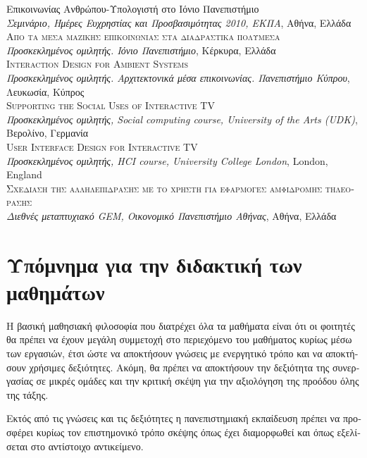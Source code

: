 \documentclass[11pt, a4paper]{article}
\newcommand{\note}[1]{\marginnote{\scriptsize #1}}
\begin{document}
\begin{greek}
{Επικοινωνίας Ανθρώπου-Υπολογιστή στο Ιόνιο Πανεπιστήμιο}\\
\emph{Σεμινάριο, Ημέρες Ευχρηστίας και Προσβασιμότητας 2010,
ΕΚΠΑ}, Αθήνα, Ελλάδα\\[.2cm]
\note{2007}\textsc{Από τα μέσα μαζικής επικοινωνίας στα διαδραστικά
πολυμέσα}\\
\emph{Προσκεκλημένος ομιλητής. Ιόνιο Πανεπιστήμιο}, Κέρκυρα,
Ελλάδα\\[.2cm]
\note{2006}\textsc{Interaction Design for Ambient Systems}\\
\emph{Προσκεκλημένος ομιλητής. Αρχιτεκτονικά μέσα επικοινωνίας.
Πανεπιστήμιο Κύπρου}, Λευκωσία, Κύπρος\\[.2cm]
\note{2006}\textsc{Supporting the Social Uses of Interactive TV}\\
\emph{Προσκεκλημένος ομιλητής, Social computing course, University of
the Arts (UDK)}, Βερολίνο, Γερμανία\\[.2cm]
\note{2005}\textsc{User Interface Design for Interactive TV}\\
\emph{Προσκεκλημένος ομιλητής, HCI course, University College
London}, London, England\\[.2cm]
\note{2002}\textsc{Σχεδίαση της αλληλεπίδρασης με το χρήστη για
εφαρμογές αμφίδρομης τηλεόρασης}\\
\emph{Διεθνές μεταπτυχιακό GEM, Οικονομικό Πανεπιστήμιο Αθήνας}, Αθήνα,
Ελλάδα\\[.2cm]

\section{Υπόμνημα για την διδακτική των
μαθημάτων}\label{ux3c5ux3c0ux3ccux3bcux3bdux3b7ux3bcux3b1-ux3b3ux3b9ux3b1-ux3c4ux3b7ux3bd-ux3b4ux3b9ux3b4ux3b1ux3baux3c4ux3b9ux3baux3ae-ux3c4ux3c9ux3bd-ux3bcux3b1ux3b8ux3b7ux3bcux3acux3c4ux3c9ux3bd}

Η βασική μαθησιακή φιλοσοφία που διατρέχει όλα τα μαθήματα είναι ότι οι
φοιτητές θα πρέπει να έχουν μεγάλη συμμετοχή στο περιεχόμενο του
μαθήματος κυρίως μέσω των εργασιών, έτσι ώστε να αποκτήσουν γνώσεις με
ενεργητικό τρόπο και να αποκτήσουν χρήσιμες δεξιότητες. Ακόμη, θα πρέπει
να αποκτήσουν την δεξιότητα της συνεργασίας σε μικρές ομάδες και την
κριτική σκέψη για την αξιολόγηση της προόδου όλης της τάξης.

Εκτός από τις γνώσεις και τις δεξιότητες η πανεπιστημιακή εκπαίδευση
πρέπει να προσφέρει κυρίως τον επιστημονικό τρόπο σκέψης όπως έχει
διαμορφωθεί και όπως εξελίσεται στο αντίστοιχο αντικείμενο.


\end{greek}
\end{document}
